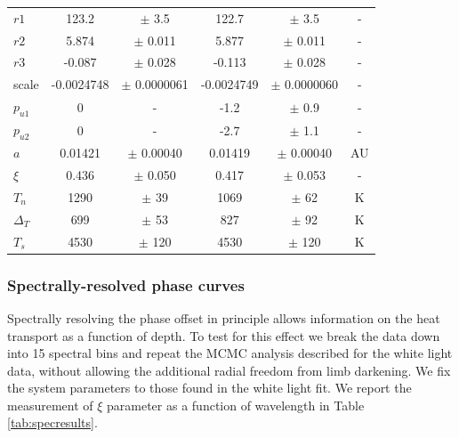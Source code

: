 \documentclass[a4paper,fleqn,usenatbib]{mnras}
\begin{document}
\begin{center}
\begin{table}
{\begin{center}
\begin{tabular}{l c c c c c}
$r1$ &        123.2 & $\pm$         3.5 &        122.7 & $\pm$         3.5 & -\\
$r2$ &        5.874 & $\pm$       0.011 &        5.877 & $\pm$       0.011 & -\\
$r3$ &       -0.087 & $\pm$       0.028 &       -0.113 & $\pm$       0.028 & -\\
scale &   -0.0024748 & $\pm$   0.0000061 &   -0.0024749 & $\pm$   0.0000060 & -\\
$p_{u1}$ & 0 & - &         -1.2 & $\pm$         0.9 & -\\
$p_{u2}$ & 0 & - &         -2.7 & $\pm$         1.1 & -\\
$a$ &      0.01421 & $\pm$     0.00040 &      0.01419 & $\pm$     0.00040 & AU\\
$\xi$ &        0.436 & $\pm$       0.050 &        0.417 & $\pm$       0.053 & -\\
$T_n$ &         1290 & $\pm$          39 &         1069 & $\pm$          62 & K\\
$\Delta_T$ &          699 & $\pm$          53 &          827 & $\pm$          92 & K\\
$T_s$ &         4530 & $\pm$         120 &         4530 & $\pm$         120 & K\\
\end{tabular}
\end{center}
\label{tab:results}
}
\end{table}
\end{center}

\subsubsection{Spectrally-resolved phase curves}


Spectrally resolving the phase offset in principle allows information on the heat transport as a function of depth. To test for this effect we break the data down into 15 spectral bins and repeat the MCMC analysis described for the white light data, without allowing the additional radial freedom from limb darkening. We fix the system parameters to those found in the white light fit. We report the measurement of $\xi$ parameter as a function of wavelength in Table \ref{tab:specresults}.
\end{document}
